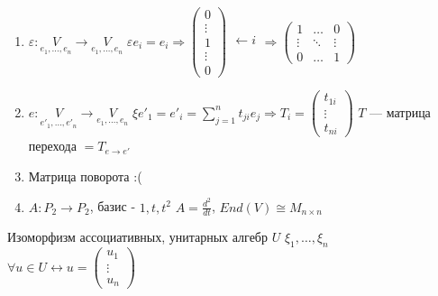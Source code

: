 \documentclass[12pt,a4paper]{article}
\begin{document}
\begin{enumerate}
	\item $\varepsilon: \underset{e_1, \ldots, e_n}{V} \rightarrow \underset{e_1, \ldots, e_n}{V}$ \newline
		$\varepsilon e_i = e_i \Rightarrow 
			\left(
			\begin{matrix}
				0 \\
				\vdots \\
				1 \\
				\vdots \\
				0
			\end{matrix}
			\right)
			\begin{matrix}
				\\
				\\
				\leftarrow i\\
				\\
				\\
			\end{matrix} \Rightarrow
			\left(
			\begin{matrix}
				1 & \ldots & 0 \\
				\vdots & \ddots & \vdots \\
				0 & \ldots & 1
			\end{matrix}
			\right)$
	\item $e : \underset{e'_1, \ldots, e'_n}{V} \rightarrow \underset{e_1, \ldots, e_n}{V}$ \newline
		$\xi e'_1 = e'_i = \sum\limits_{j=1}^{n} t_{ji}e_j \Rightarrow T_i = 
		\left(
		\begin{matrix}
			t_{1i} \\
			\vdots \\
			t_{ni}
		\end{matrix}
		\right)$ \newline
		$T$ --- матрица перехода $= T_{e \rightarrow e'}$
	\item Матрица поворота :(
	\item $A: P_2 \rightarrow P_2$, базис - $1, t, t^2$ \newline
		$A = \frac{d^2}{dt}$, $End(V) \cong M_{n\times n}$
\end{enumerate}
Изоморфизм ассоциативных, унитарных алгебр \newline
$U$ $\xi_1, \ldots, \xi_n$ $\forall u \in U \leftrightarrow u = 
	\left(
	\begin{matrix}
	u_1 \\
	\vdots \\
	u_n
	\end{matrix}
	\right)$ \newline
\end{document}
